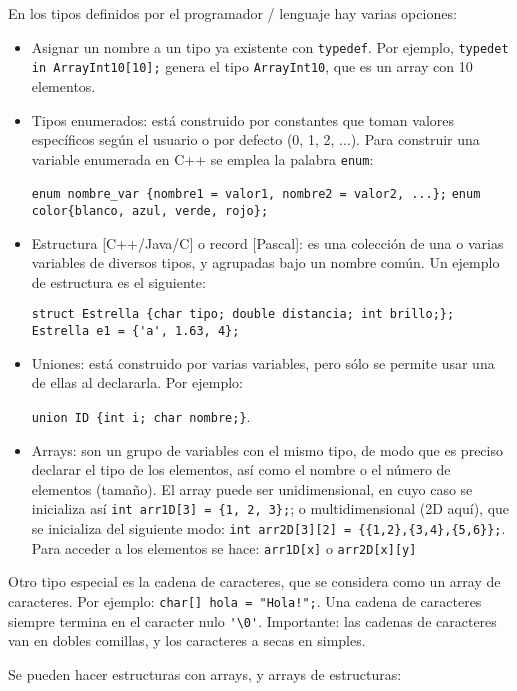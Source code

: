 \documentclass[a4paper]{article}
\begin{document}
	En los tipos definidos por el programador / lenguaje hay varias opciones:
	\begin{itemize}
		\item Asignar un nombre a un tipo ya existente con \verb|typedef|. Por ejemplo, \verb|typedet in ArrayInt10[10];| genera el tipo \verb|ArrayInt10|, que es un array con 10 elementos.
		\item Tipos enumerados: está construido por constantes que toman valores específicos según el usuario o por defecto (0, 1, 2, ...). Para construir una variable enumerada en C++ se emplea la palabra \verb|enum|:
		
		\verb|enum nombre_var {nombre1 = valor1, nombre2 = valor2, ...};| \linebreak
		\verb|enum color{blanco, azul, verde, rojo};|
		
		\item Estructura [C++/Java/C] o record [Pascal]: es una colección de una o varias variables de diversos tipos, y agrupadas bajo un nombre común. Un ejemplo de estructura es el siguiente:
		
		\verb|struct Estrella {char tipo; double distancia; int brillo;};|\linebreak
		\verb|Estrella e1 = {'a', 1.63, 4};|
		
		\item Uniones: está construido por varias variables, pero sólo se permite usar una de ellas al declararla. Por ejemplo:
		
		 \verb|union ID {int i; char nombre;}|.
		
		\item Arrays: son un grupo de variables con el mismo tipo, de modo que es preciso declarar el tipo de los elementos, así como el nombre o el número de elementos (tamaño). El array puede ser unidimensional, en cuyo caso se inicializa así \verb|int arr1D[3] = {1, 2, 3};|; o multidimensional (2D aquí), que se inicializa del siguiente modo: \verb|int arr2D[3][2] = {{1,2},{3,4},{5,6}};|. Para acceder a los elementos se hace: \verb|arr1D[x]| o \verb|arr2D[x][y]|
	\end{itemize}
	
	Otro tipo especial es la cadena de caracteres, que se considera como un array de caracteres. Por ejemplo: \verb|char[] hola = "Hola!";|. Una cadena de caracteres siempre termina en el caracter nulo \verb|'\0'|. Importante: las cadenas de caracteres van en dobles comillas, y los caracteres a secas en simples.
	
	Se pueden hacer estructuras con arrays, y arrays de estructuras:
	
\end{document}
